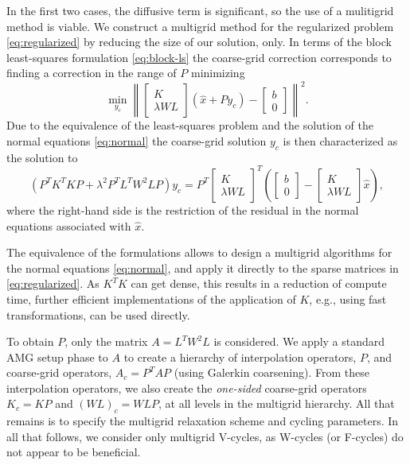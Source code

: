 In the first two cases, the diffusive term is significant, so the use
of a mulitigrid method is viable. We construct a multigrid method for
the regularized problem \eqref{eq:regularized} by reducing the size of
our solution, only. In terms of the block least-squares formulation
\eqref{eq:block-ls} the coarse-grid correction corresponds to finding
a correction in the range of $P$ minimizing
\[
\min_{y_c}\left\| \left[\begin{array}{c} K \\ \lambda
      WL\end{array}\right](\hat{x}+Py_c) - \left[\begin{array}{c} b \\ 0 \end{array}\right]\right\|^2.
\]
Due to the equivalence of the least-squares problem and the solution
of the normal equations \eqref{eq:normal} the coarse-grid solution $y_c$ is then characterized as the solution to
\[
\left(P^TK^TKP + \lambda^2P^TL^TW^2LP\right)y_c =
P^T\left[\begin{array}{c} K \\ \lambda WL\end{array}\right]^T
\left(\left[\begin{array}{c} b \\ 0 \end{array}\right] - \left[\begin{array}{c} K \\ \lambda
      WL\end{array}\right]\hat{x}\right),
\]
where the right-hand side is the restriction of the residual in the
normal equations associated with $\hat{x}$.

The equivalence of the formulations allows to design a multigrid
algorithms for the normal equations \eqref{eq:normal}, and apply it
directly to the sparse matrices in \eqref{eq:regularized}. As $K^TK$
can get dense, this results in a reduction of compute time, further
efficient implementations of the application of $K$, e.g., using fast
transformations, can be used directly.

To obtain $P$, only the matrix $A = L^T W^2 L$ is considered. We apply a
standard AMG setup phase to $A$ to create a hierarchy of interpolation
operators, $P$, and coarse-grid operators, $A_c = P^TAP$ (using
Galerkin coarsening).  From these interpolation operators, we also
create the \textit{one-sided} coarse-grid operators $K_c = KP$ and $(WL)_c =
WLP$, at all levels in the multigrid hierarchy. All that remains is to
specify the multigrid relaxation scheme and cycling parameters.  In
all that follows, we consider only multigrid V-cycles, as W-cycles (or
F-cycles) do not appear to be beneficial.

